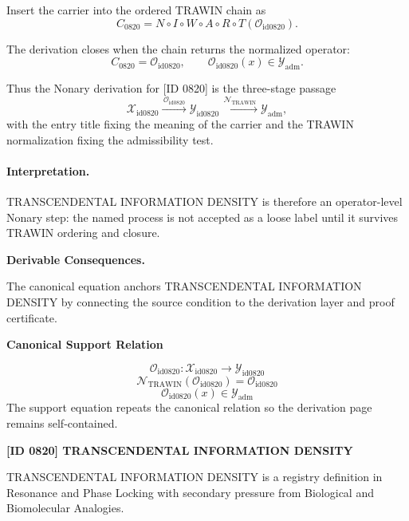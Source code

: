 Insert the carrier into the ordered TRAWIN chain as\[
C_{0820}=N\circ I\circ W\circ A\circ R\circ T(\mathcal{O}_{\mathrm{id0820}}).
\]

The derivation closes when the chain returns the normalized operator:\[
C_{0820}=\mathcal{O}_{\mathrm{id0820}},\qquad \mathcal{O}_{\mathrm{id0820}}(x)\in\mathcal{Y}_{\mathrm{adm}}.
\]

Thus the Nonary derivation for [ID 0820] is the three-stage passage
\[
\mathcal{X}_{\mathrm{id0820}}\xrightarrow{\,\mathcal{O}_{\mathrm{id0820}}\,} \mathcal{Y}_{\mathrm{id0820}}\xrightarrow{\,\mathcal{N}_{\mathrm{TRAWIN}}\,} \mathcal{Y}_{\mathrm{adm}},
\]
with the entry title fixing the meaning of the carrier and the TRAWIN normalization fixing the admissibility test.

\paragraph{Interpretation.} TRANSCENDENTAL INFORMATION DENSITY is therefore an operator-level Nonary step: the named process is not accepted as a loose label until it survives TRAWIN ordering and closure.

\par\vspace{0.35em}
\noindent\textbf{Derivable Consequences.}\quad
\begingroup
\footnotesize
\raggedright
The canonical equation anchors TRANSCENDENTAL INFORMATION DENSITY by connecting the source condition to the derivation layer and proof certificate.
\par\endgroup

\noindent\textbf{Canonical Support Relation}\par
\[
\mathcal{O}_{\mathrm{id0820}}:\mathcal{X}_{\mathrm{id0820}}\longrightarrow\mathcal{Y}_{\mathrm{id0820}}
\]
\[
\mathcal{N}_{\mathrm{TRAWIN}}(\mathcal{O}_{\mathrm{id0820}})=\mathcal{O}_{\mathrm{id0820}}
\]
\[
\mathcal{O}_{\mathrm{id0820}}(x)\in\mathcal{Y}_{\mathrm{adm}}
\]
\noindent The support equation repeats the canonical relation so the derivation page remains self-contained.\par

\clearpage
\noindent\textbf{[ID 0820] TRANSCENDENTAL INFORMATION DENSITY}\par
\vspace{0.35em}
\begingroup\small
{}
TRANSCENDENTAL INFORMATION DENSITY is a registry definition in Resonance and Phase Locking with secondary pressure from Biological and Biomolecular Analogies.

